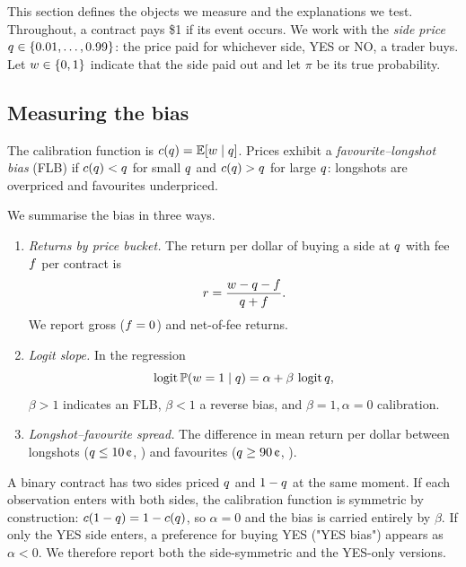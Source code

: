 This section defines the objects we measure and the explanations we test. Throughout, a
contract pays \$1 if its event occurs. We work with the \emph{side price} $q\in\{0.01,\dots,0.99\}$:
the price paid for whichever side, YES or NO, a trader buys. Let $w\in\{0,1\}$ indicate that
the side paid out and let $\pi$ be its true probability.

\subsection{Measuring the bias}\label{sec:framework-measures}

\begin{definition}\label{def:flb}
The calibration function is $c(q)=\mathbb{E}[w\mid q]$. Prices exhibit a \emph{favourite--longshot
bias} (FLB) if $c(q)<q$ for small $q$ and $c(q)>q$ for large $q$: longshots are overpriced
and favourites underpriced.
\end{definition}

We summarise the bias in three ways.
\begin{enumerate}
  \item \emph{Returns by price bucket.} The return per dollar of buying a side at $q$ with fee
  $f$ per contract is
  \begin{equation}\label{eq:ret}
    r=\frac{w-q-f}{q+f}.
  \end{equation}
  We report gross ($f=0$) and net-of-fee returns.
  \item \emph{Logit slope.} In the regression
  \begin{equation}\label{eq:logit}
    \operatorname{logit}\mathbb{P}(w=1\mid q)=\alpha+\beta\,\operatorname{logit}q,
  \end{equation}
  $\beta>1$ indicates an FLB, $\beta<1$ a reverse bias, and $\beta=1,\alpha=0$ calibration.
  \item \emph{Longshot--favourite spread.} The difference in mean return per dollar between
  longshots ($\q\le 10\cents$, \LS) and favourites ($\q\ge 90\cents$, \FAV).
\end{enumerate}

A binary contract has two sides priced $q$ and $1-q$ at the same moment. If each observation enters with both sides, the calibration function is symmetric by construction:
$c(1-q)=1-c(q)$, so $\alpha=0$ and the bias is carried entirely by $\beta$. If only the YES side
enters, a preference for buying YES ("YES bias") appears as $\alpha<0$. We therefore report
both the side-symmetric and the YES-only versions.

